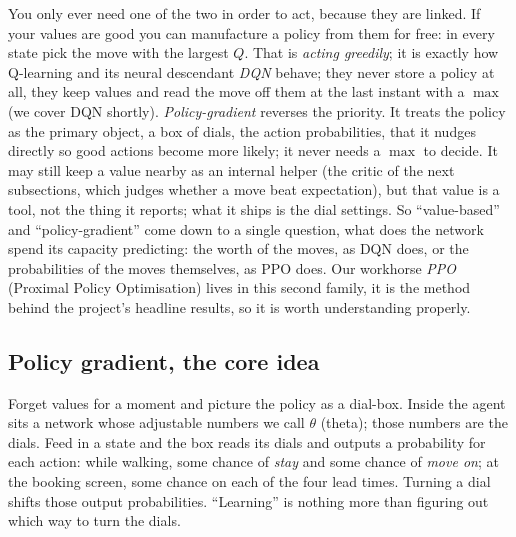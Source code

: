 \documentclass[11pt]{article}
\newcommand{\key}[1]{\textit{#1}}            %
\begin{document}
You only ever need one of the two in order to act, because they are linked. If your values
are good you can manufacture a policy from them for free: in every state pick the move with
the largest $Q$. That is \key{acting greedily}; it is exactly how Q-learning and its
neural descendant \key{DQN} behave; they never store a policy at all, they keep values and
read the move off them at the last instant with a $\max$ (we cover DQN shortly).
\key{Policy-gradient} reverses the priority. It treats the policy as the primary object, a
box of dials, the action probabilities, that it nudges directly so good actions become more
likely; it never needs a $\max$ to decide. It may still keep a value nearby as an internal
helper (the critic of the next subsections, which judges whether a move beat expectation),
but that value is a tool, not the thing it reports; what it ships is the dial settings. So
``value-based'' and ``policy-gradient'' come down to a single question, what does the network
spend its capacity predicting: the worth of the moves, as DQN does, or the probabilities of
the moves themselves, as PPO does. Our workhorse \key{PPO} (Proximal Policy Optimisation)
lives in this second family, it is the method behind the project's headline results, so it is
worth understanding properly.

\subsection{Policy gradient, the core idea}

Forget values for a moment and picture the policy as a dial-box. Inside the agent sits a
network whose adjustable numbers we call $\theta$ (theta); those numbers are the dials.
Feed in a state and the box reads its dials and outputs a probability for each action: while
walking, some chance of \emph{stay} and some chance of \emph{move on}; at the booking screen,
some chance on each of the four lead times. Turning a dial shifts those output probabilities.
``Learning'' is nothing more than figuring out which way to turn the dials.
\end{document}
